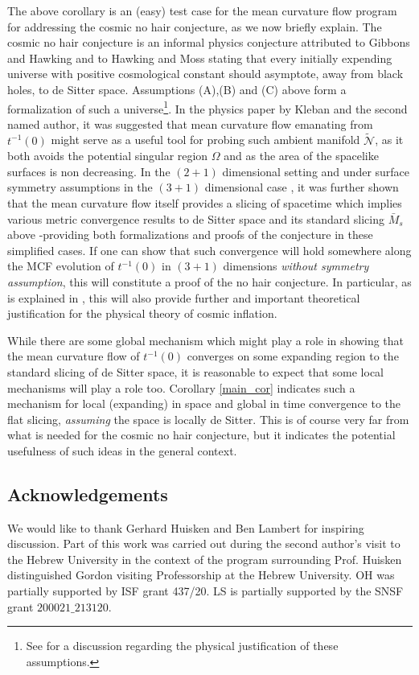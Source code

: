 \documentclass[leqno,11pt]{amsart}
\theoremstyle{definition}
\begin{document}
The above corollary is an (easy) test case for the mean curvature flow program for addressing the cosmic no hair conjecture, as we now briefly explain.  The cosmic no hair conjecture  is an informal physics conjecture attributed to Gibbons and Hawking \cite{GibonHawking} and to Hawking and Moss \cite{HawkingMoss}  stating that every initially expending universe with positive cosmological constant should asymptote, away from black holes, to de Sitter space. Assumptions (A),(B) and (C) above form a formalization of such a universe\footnote{See \cite{CHSV} for a discussion regarding the physical justification of these assumptions.}.  In the physics paper \cite{KS} by Kleban and the second named author, it was suggested that mean curvature flow emanating from $t^{-1}(0)$  might serve as a useful tool for probing such ambient manifold $\tilde{\mathcal{N}}$, as it both avoids the potential singular region $\Omega$ and as the area of the spacelike surfaces is non decreasing. In the $(2+1)$ dimensional setting  \cite{CSV} and under surface symmetry assumptions in the $(3+1)$ dimensional case \cite{CHSV}, it was further shown that the mean curvature flow itself provides a slicing of spacetime which implies various metric convergence results to de Sitter space and its standard slicing $\bar{M}_s$ above -providing both formalizations and proofs of the conjecture in these simplified cases. If one can show that such convergence will hold somewhere along the MCF evolution of $t^{-1}(0)$ in $(3+1)$ dimensions \textit{without symmetry assumption}, this will constitute a proof of the no hair conjecture. In particular, as is explained in \cite{CHSV}, this will also provide  further and important theoretical justification for the physical theory of cosmic inflation. 

\bigskip

While there are some global mechanism which might play a role in showing that the mean curvature flow of $t^{-1}(0)$ converges on some expanding region to the standard slicing of de Sitter space, it is reasonable to expect that some local mechanisms will play a role too. Corollary \ref{main_cor} indicates such a mechanism for local (expanding) in space and global in time convergence to the flat slicing, \textit{assuming} the space is locally de Sitter. This is of course very far from what is needed for the cosmic no hair conjecture, but it indicates the { potential usefulness} of such ideas in the general context.
\subsection*{Acknowledgements}
We would like to thank Gerhard Huisken and Ben Lambert for inspiring discussion. Part of this work was carried out during the second author's visit to the Hebrew University in the context of the program surrounding Prof. Huisken distinguished Gordon visiting Professorship at the Hebrew University. OH was partially supported by ISF grant 437/20. LS is partially supported by the SNSF grant $200021\_213120$.
\end{document}
